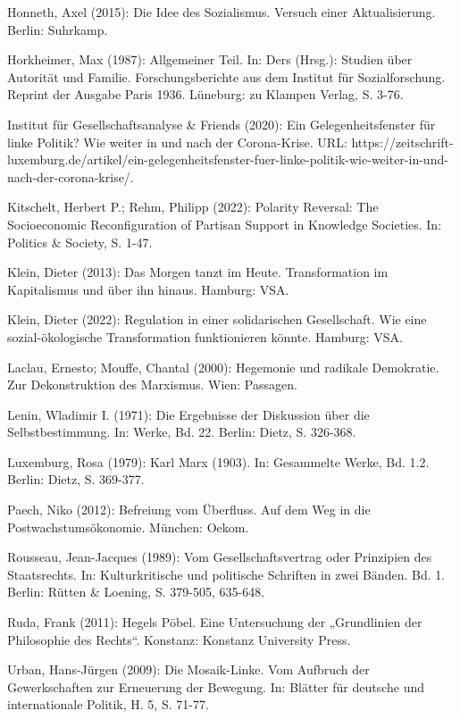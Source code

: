 \begin{multicols*}{2}
\begin{bibdescription}
        \item Honneth, Axel (2015): Die Idee des Sozialismus. Versuch einer Aktualisierung. Berlin: Suhrkamp.
        \item Horkheimer, Max (1987): Allgemeiner Teil. In: Ders (Hrsg.): Studien über Autorität und Familie. Forschungsberichte aus dem Institut für Sozialforschung. Reprint der Ausgabe Paris 1936. Lüneburg: zu Klampen Verlag, S. 3-76.
        \item Institut für Gesellschaftsanalyse \& Friends (2020): Ein Gelegenheitsfenster für linke Politik? Wie weiter in und nach der Corona-Krise. URL: https://zeitschrift-luxemburg.de/artikel/ein-gelegenheitsfenster-fuer-linke-politik-wie-weiter-in-und-nach-der-corona-krise/.
        \item Kitschelt, Herbert P.; Rehm, Philipp (2022): Polarity Reversal: The Socioeconomic Reconfiguration of Partisan Support in Knowledge Societies. In: Politics \& Society, S. 1-47.
        \item Klein, Dieter (2013): Das Morgen tanzt im Heute. Transformation im Kapitalismus und über ihn hinaus. Hamburg: VSA.
        \item  Klein, Dieter (2022): Regulation in einer solidarischen Gesellschaft. Wie eine sozial-ökologische Transformation funktionieren könnte. Hamburg: VSA.
        \item Laclau, Ernesto; Mouffe, Chantal (2000): Hegemonie und radikale Demokratie. Zur Dekonstruktion des Marxismus. Wien: Passagen.
        \item Lenin, Wladimir I. (1971): Die Ergebnisse der Diskussion über die Selbstbestimmung. In: Werke, Bd. 22. Berlin: Dietz, S. 326-368.
        \item Luxemburg, Rosa (1979): Karl Marx (1903). In: Gesammelte Werke, Bd. 1.2. Berlin: Dietz, S. 369-377.
        \item Paech, Niko (2012): Befreiung vom Überfluss. Auf dem Weg in die Postwachstumsökonomie. München: Oekom.
        \item Rousseau, Jean-Jacques (1989): Vom Gesellschaftsvertrag oder Prinzipien des Staatsrechts. In: Kulturkritische und politische Schriften in zwei Bänden. Bd. 1. Berlin: Rütten \& Loening, S. 379-505, 635-648.
        \item Ruda, Frank (2011): Hegels Pöbel. Eine Untersuchung der „Grundlinien der Philosophie des Rechts“. Konstanz: Konstanz University Press.
        \item Urban, Hans-Jürgen (2009): Die Mosaik-Linke. Vom Aufbruch der Gewerkschaften zur Erneuerung der Bewegung. In: Blätter für deutsche und internationale Politik, H. 5, S. 71-77.

\end{bibdescription}
\end{multicols*}
